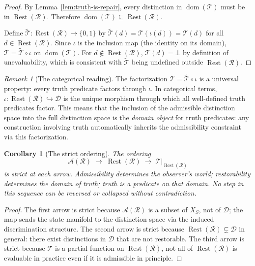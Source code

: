 \documentclass[12pt, oneside]{article}
\theoremstyle{plain}
\newtheorem{corollary}[theorem]{Corollary}
\theoremstyle{definition}
\theoremstyle{remark}
\newtheorem{remark}[theorem]{Remark}
\DeclareMathOperator{\Rest}{Rest}
\newcommand{\AO}{\mathcal{A}}
\newcommand{\Dsub}{\mathcal{D}}
\newcommand{\Xsub}{X_S}
\newcommand{\Tsub}{\mathcal{T}}
\newcommand{\Ttilde}{\widetilde{\mathcal{T}}}
\newcommand{\iotamap}{\iota}        %
\newcommand{\RestR}{\Rest(\mathcal{R})}
\newcommand{\Undef}{\mathord{\perp}} %
\begin{document}
\begin{proof}
  By Lemma~\ref{lem:truth-is-repair}, every distinction in
  $\operatorname{dom}(\Tsub)$ must be in $\RestR$.
  Therefore $\operatorname{dom}(\Tsub) \subseteq \RestR$.

  Define $\Ttilde: \RestR \to \{0,1\}$ by
  $\Ttilde(d) = \Tsub(\iotamap(d)) = \Tsub(d)$ for all
  $d \in \RestR$.
  Since $\iotamap$ is the inclusion map (the identity on its domain),
  $\Tsub = \Ttilde \circ \iotamap$ on $\operatorname{dom}(\Tsub)$.
  For $d \notin \RestR$, $\Tsub(d) = \Undef$ by definition of
  unevaluability, which is consistent with $\Ttilde$ being
  undefined outside $\RestR$.
\end{proof}

\begin{remark}[The categorical reading]
  The factorization $\Tsub = \Ttilde \circ \iotamap$ is a universal
  property: every truth predicate factors through $\iotamap$.
  In categorical terms, $\iotamap: \RestR \hookrightarrow \Dsub$ is
  the unique morphism through which all well-defined truth
  predicates factor.
  This means that the inclusion of the admissible distinction space
  into the full distinction space is the \emph{domain object} for
  truth predicates: any construction involving truth automatically
  inherits the admissibility constraint via this factorization.
\end{remark}

\begin{corollary}[The strict ordering]
  The ordering
  \[
    \AO(\mathcal{R})
    \;\longrightarrow\;
    \RestR
    \;\longrightarrow\;
    \Tsub|_{\RestR}
  \]
  is strict at each arrow.
  Admissibility determines the observer's world;
  restorability determines the domain of truth;
  truth is a predicate on that domain.
  No step in this sequence can be reversed or collapsed without
  contradiction.
  \label{cor:strict-ordering}
\end{corollary}

\begin{proof}
  The first arrow is strict because $\AO(\mathcal{R})$ is a subset
  of $\Xsub$, not of $\Dsub$; the map sends the state manifold to
  the distinction space via the induced discrimination structure.
  The second arrow is strict because $\RestR \subsetneq \Dsub$
  in general: there exist distinctions in $\Dsub$ that are not
  restorable.
  The third arrow is strict because $\Tsub$ is a partial function
  on $\RestR$, not all of $\RestR$ is evaluable in practice even
  if it is admissible in principle.
\end{proof}
\end{document}
